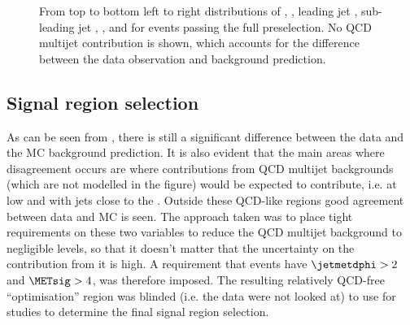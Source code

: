 \begin{figure}
  \caption{From top to bottom left to right distributions of \detajj, \Mjj, leading jet \pt, sub-leading jet \pt, \METnoMU, \METsig and \jetmetdphi for events passing the full preselection. No \ac{QCD} multijet contribution is shown, which accounts for the difference between the data observation and background prediction.}
  \label{fig:parkedpostpresel}
\end{figure}





\subsection{Signal region selection}
\label{sec:parkedsigsel}
As can be seen from , there is still a significant difference between the data and the \ac{MC} background prediction. It is also evident that the main areas where disagreement occurs are where contributions from \ac{QCD} multijet backgrounds (which are not modelled in the figure) would be expected to contribute, i.e. at low \METsig and with jets close to the \METnoMU. Outside these \ac{QCD}-like regions good agreement between data and \ac{MC} is seen. The approach taken was to place tight requirements on these two variables to reduce the \ac{QCD} multijet background to negligible levels, so that it doesn't matter that the uncertainty on the contribution from it is high. A requirement that events have $\jetmetdphi>2$ and $\METsig>4$, was therefore imposed. The resulting relatively \ac{QCD}-free ``optimisation'' region was blinded (i.e. the data were not looked at) to use for studies to determine the final signal region selection.

